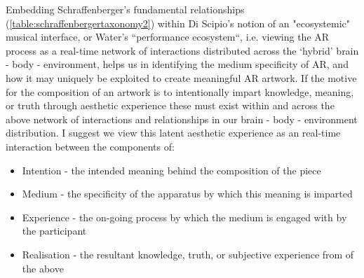Embedding Schraffenberger's fundamental relationships (\autoref{table:schraffenbergertaxonomy2}) within Di Scipio's notion of an "ecosystemic" musical interface, or Water's ``performance ecosystem``, i.e. viewing the AR process as a real-time network of interactions distributed across the `hybrid' brain - body - environment, helps us in identifying the medium specificity of AR, and how it may uniquely be exploited to create meaningful AR artwork. If the motive for the composition of an artwork is to intentionally impart knowledge, meaning, or truth through aesthetic experience these must exist within and across the above network of interactions and relationships in our brain - body - environment distribution. I suggest we view this latent aesthetic experience as an real-time interaction between the components of:
\begin{itemize}
    \item Intention - the intended meaning behind the composition of the piece
    \item Medium - the specificity of the apparatus by which this meaning is imparted
    \item Experience - the on-going process by which the medium is engaged with by the participant
    \item Realisation - the resultant knowledge, truth, or subjective experience from of the above
\end{itemize}

